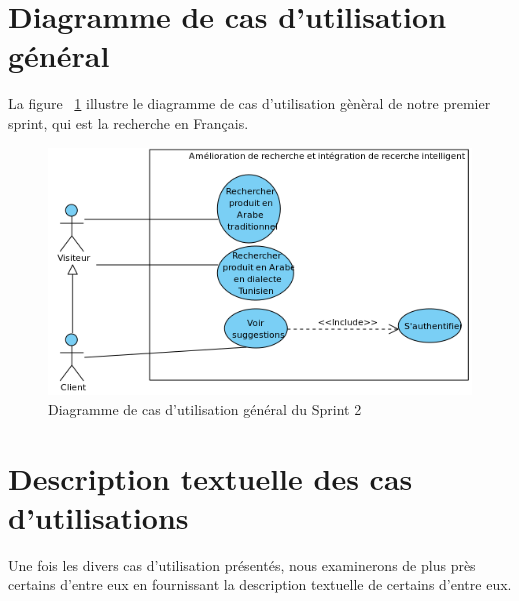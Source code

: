 \section{Diagramme de cas d'utilisation général}
\noindent
La figure ~\ref{fig:recherchearabe} illustre le diagramme de cas d'utilisation gènèral de notre premier sprint, qui est la recherche en Français.

\begin{figure}[H]
	\centering
	\includegraphics[width=1\textwidth]{logos/cusprint2.png}
	\caption{Diagramme de cas d'utilisation général du Sprint 2}
	\label{fig:recherchearabe}
\end{figure}

\section{Description textuelle des cas d’utilisations}
Une fois les divers cas d'utilisation présentés, nous examinerons de plus près certains
d'entre eux en fournissant la description textuelle de certains d'entre eux.

\newpage
